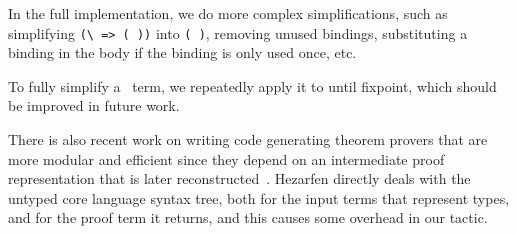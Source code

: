 In the full implementation, we do more complex simplifications, such as
simplifying \texttt{(\textbackslash{} =>  ( ))} into
\texttt{(  )}, removing unused  bindings,
substituting a  binding in the body if the binding is only used once,
etc.

To fully simplify a \Raw\ term, we repeatedly apply it to  until
fixpoint, which should be improved in future work.

There is also recent work on writing code generating theorem provers that
are more modular and efficient since they depend on an intermediate proof
representation that is later reconstructed~\cite{theoremProverCodeGeneration}.
Hezarfen directly deals with the untyped core language syntax tree, both for
the input terms that represent types, and for the proof term it returns, and
this causes some overhead in our tactic.
